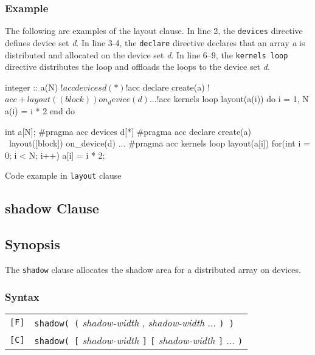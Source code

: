 \subsubsection*{Example}
The following are examples of the layout clause.
In line 2, the {\tt devices} directive defines device set {\it d}.
In line 3-4, the {\tt declare} directive declares that an array {\it a} is distributed and allocated on the device set {\it d}.
In line 6--9, the {\tt kernels loop} directive distributes the loop and offloads the loops to the device set {\it d}.
%
\begin{myfigure}
\begin{minipage}{0.47\hsize}
\begin{center}
\begin{XACCFexampleL}
integer :: a(N)
!$acc devices d(*)
!$acc declare create(a)
!$acc+layout((block)) on_device(d)
...
!$acc kernels loop layout(a(i))
do i = 1, N
  a(i) = i * 2
end do
\end{XACCFexampleL}
\end{center}
\end{minipage}
%
\begin{minipage}{0.48\hsize}
\begin{center}
\begin{XACCCexampleR}
int a[N];
#pragma acc devices d[*]
#pragma acc declare create(a) \
        layout([block]) on_device(d)
...
#pragma acc kernels loop layout(a[i])
for(int i = 0; i < N; i++){
  a[i] = i * 2;
}
\end{XACCCexampleR}
\end{center}
\end{minipage}
\caption{Code example in {\XACC} {\tt layout} clause}\label{code:layout_clause}
\end{myfigure}


\subsection{shadow Clause}
\subsection*{Synopsis}
The {\tt shadow} clause allocates the shadow area for a distributed array on devices.

\subsubsection*{Syntax}
\begin{tabular}{ll}
  \verb![F]! & \verb|shadow( (| {\it shadow-width} {\openb}, {\it shadow-width} {\closeb} ... \verb|) )|\\
  \verb![C]! & \verb|shadow( [| {\it shadow-width} \verb|]| {\openb} \verb|[| {\it shadow-width} \verb|]| {\closeb} ... \verb|)|
\end{tabular}

